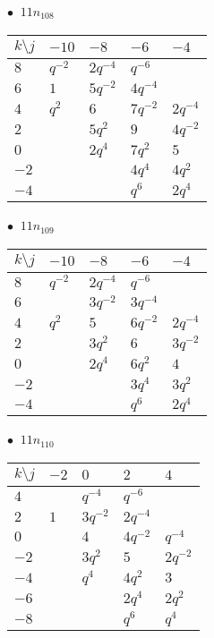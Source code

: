 \begin{minipage}{\linewidth}
$\bullet\ $ $11n_{108}$ \vspace{0.5em} \\
\begin{tabular}{l|llll}
$k \setminus j$ & $-10$ & $-8$ & $-6$ & $-4$ \\
\hline
$8$ & $q^{-2}$ & $2q^{-4}$ & $q^{-6}$ &  \\
$6$ & $1$ & $5q^{-2}$ & $4q^{-4}$ &  \\
$4$ & $q^{2}$ & $6$ & $7q^{-2}$ & $2q^{-4}$ \\
$2$ &  & $5q^{2}$ & $9$ & $4q^{-2}$ \\
$0$ &  & $2q^{4}$ & $7q^{2}$ & $5$ \\
$-2$ &  &  & $4q^{4}$ & $4q^{2}$ \\
$-4$ &  &  & $q^{6}$ & $2q^{4}$ \\
\end{tabular}
\vspace{2em}
\end{minipage}
%
\begin{minipage}{\linewidth}
$\bullet\ $ $11n_{109}$ \vspace{0.5em} \\
\begin{tabular}{l|llll}
$k \setminus j$ & $-10$ & $-8$ & $-6$ & $-4$ \\
\hline
$8$ & $q^{-2}$ & $2q^{-4}$ & $q^{-6}$ &  \\
$6$ &  & $3q^{-2}$ & $3q^{-4}$ &  \\
$4$ & $q^{2}$ & $5$ & $6q^{-2}$ & $2q^{-4}$ \\
$2$ &  & $3q^{2}$ & $6$ & $3q^{-2}$ \\
$0$ &  & $2q^{4}$ & $6q^{2}$ & $4$ \\
$-2$ &  &  & $3q^{4}$ & $3q^{2}$ \\
$-4$ &  &  & $q^{6}$ & $2q^{4}$ \\
\end{tabular}
\vspace{2em}
\end{minipage}
%
\begin{minipage}{\linewidth}
$\bullet\ $ $11n_{110}$ \vspace{0.5em} \\
\begin{tabular}{l|llll}
$k \setminus j$ & $-2$ & $0$ & $2$ & $4$ \\
\hline
$4$ &  & $q^{-4}$ & $q^{-6}$ &  \\
$2$ & $1$ & $3q^{-2}$ & $2q^{-4}$ &  \\
$0$ &  & $4$ & $4q^{-2}$ & $q^{-4}$ \\
$-2$ &  & $3q^{2}$ & $5$ & $2q^{-2}$ \\
$-4$ &  & $q^{4}$ & $4q^{2}$ & $3$ \\
$-6$ &  &  & $2q^{4}$ & $2q^{2}$ \\
$-8$ &  &  & $q^{6}$ & $q^{4}$ \\
\end{tabular}
\vspace{2em}
\end{minipage}
